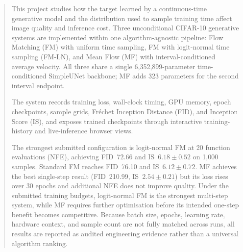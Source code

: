 \begin{table}[htbp]\centering
\caption{Course Outcome Marks Distribution}\label{tab:co}
\end{table}
\newpage

\begin{abstract}
This project studies how the target learned by a continuous-time generative model
and the distribution used to sample training time affect image quality and
inference cost. Three unconditional CIFAR-10 generative systems are implemented
within one algorithm-agnostic pipeline: Flow Matching (FM) with uniform time
sampling, FM with logit-normal time sampling (FM-LN), and Mean Flow (MF) with
interval-conditioned average velocity. All three share a single
6{,}352{,}899-parameter time-conditioned SimpleUNet backbone; MF adds 323
parameters for the second interval endpoint.

The system records training loss, wall-clock timing, GPU memory, epoch
checkpoints, sample grids, Fr\'echet Inception Distance (FID), and Inception
Score (IS), and exposes trained checkpoints through interactive training-history
and live-inference browser views.

The strongest submitted configuration is logit-normal FM at 20 function
evaluations (NFE), achieving FID~72.66 and IS~$6.18\!\pm\!0.52$ on 1{,}000
samples. Standard FM reaches FID~76.10 and IS~$6.12\!\pm\!0.72$. MF achieves
the best single-step result (FID~210.99, IS~$2.54\!\pm\!0.21$) but its loss
rises over 30 epochs and additional NFE does not improve quality. Under the
submitted training budgets, logit-normal FM is the strongest multi-step system,
while MF requires further optimisation before its intended one-step benefit
becomes competitive. Because batch size, epochs, learning rate, hardware context,
and sample count are not fully matched across runs, all results are reported as
audited engineering evidence rather than a universal algorithm ranking.
\end{abstract}

